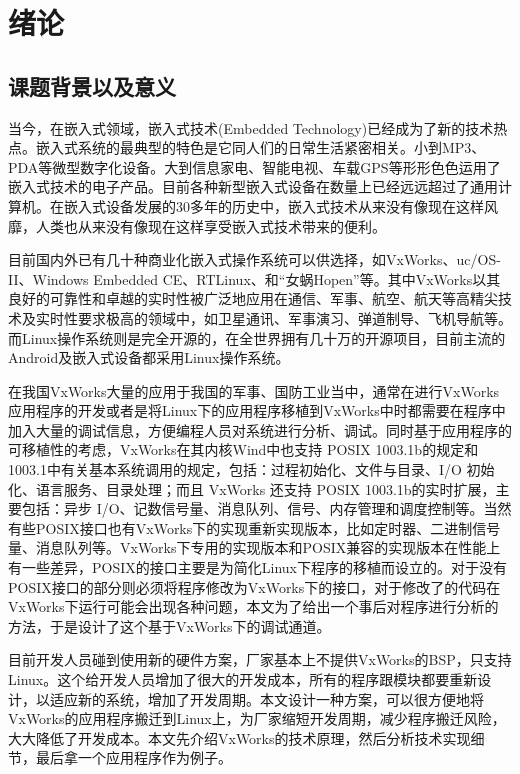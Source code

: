 \chapter{绪论}
\section{课题背景以及意义}
	当今，在嵌入式领域，嵌入式技术(Embedded Technology)已经成为了新的技术热点。嵌入式系统的最典型的特色是它同人们的日常生活紧密相关。小到MP3、PDA等微型数字化设备。大到信息家电、智能电视、车载GPS等形形色色运用了嵌入式技术的电子产品。目前各种新型嵌入式设备在数量上已经远远超过了通用计算机。在嵌入式设备发展的30多年的历史中，嵌入式技术从来没有像现在这样风靡，人类也从来没有像现在这样享受嵌入式技术带来的便利。

	目前国内外已有几十种商业化嵌入式操作系统可以供选择，如VxWorks、uc/OS-II、Windows Embedded CE、RTLinux、和“女蜗Hopen”等。其中VxWorks以其良好的可靠性和卓越的实时性被广泛地应用在通信、军事、航空、航天等高精尖技术及实时性要求极高的领域中，如卫星通讯、军事演习、弹道制导、飞机导航等。而Linux操作系统则是完全开源的，在全世界拥有几十万的开源项目，目前主流的Android及嵌入式设备都采用Linux操作系统。
	
	在我国VxWorks大量的应用于我国的军事、国防工业当中，通常在进行VxWorks应用程序的开发或者是将Linux下的应用程序移植到VxWorks中时都需要在程序中加入大量的调试信息，方便编程人员对系统进行分析、调试。同时基于应用程序的可移植性的考虑，VxWorks在其内核Wind中也支持 POSIX 1003.1b的规定和1003.1中有关基本系统调用的规定，包括：过程初始化、文件与目录、I/O 初始化、语言服务、目录处理；而且 VxWorks 还支持 POSIX 1003.1b的实时扩展，主要包括：异步 I/O、记数信号量、消息队列、信号、内存管理和调度控制等\cite{Wind2003VxWorks}。当然有些POSIX接口也有VxWorks下的实现重新实现版本，比如定时器、二进制信号量、消息队列等。VxWorks下专用的实现版本和POSIX兼容的实现版本在性能上有一些差异，POSIX的接口主要是为简化Linux下程序的移植而设立的。对于没有POSIX接口的部分则必须将程序修改为VxWorks下的接口，对于修改了的代码在VxWorks下运行可能会出现各种问题，本文为了给出一个事后对程序进行分析的方法，于是设计了这个基于VxWorks下的调试通道。
	
	目前开发人员碰到使用新的硬件方案，厂家基本上不提供VxWorks的BSP，只支持Linux。这个给开发人员增加了很大的开发成本，所有的程序跟模块都要重新设计，以适应新的系统，增加了开发周期。本文设计一种方案，可以很方便地将VxWorks的应用程序搬迁到Linux上，为厂家缩短开发周期，减少程序搬迁风险，大大降低了开发成本。本文先介绍VxWorks的技术原理，然后分析技术实现细节，最后拿一个应用程序作为例子。 
		
